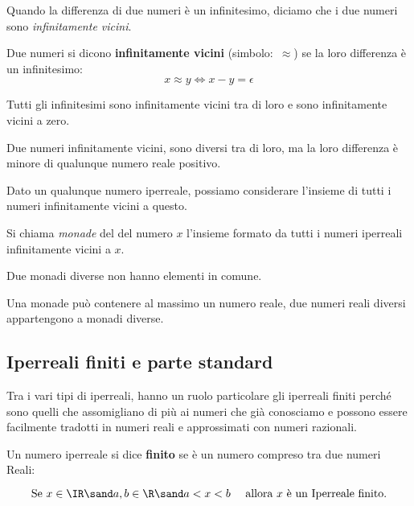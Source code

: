 Quando la differenza di due numeri è un infinitesimo, diciamo 
che i due numeri sono \emph{infinitamente vicini}.

\begin{definizione}    %
Due numeri si dicono \textbf{infinitamente vicini} (simbolo:~\(\approx\)) se 
la loro differenza è un infinitesimo:
\[x \approx y \Leftrightarrow x - y = \epsilon\]
\end{definizione}

Tutti gli infinitesimi sono infinitamente vicini tra di loro e sono 
infinitamente vicini a zero.

Due numeri infinitamente vicini, sono diversi tra di loro, ma la loro 
differenza è minore di qualunque numero reale positivo.

Dato un qualunque numero iperreale, possiamo considerare l'insieme di tutti 
i numeri infinitamente vicini a questo. 

\begin{definizione}
 Si chiama \emph{monade} del del numero \(x\) l'insieme formato da tutti i 
numeri iperreali infinitamente vicini a \(x\).
\end{definizione}

Due monadi diverse non hanno elementi in comune.

Una monade può contenere al massimo un numero reale, due numeri reali 
diversi appartengono a monadi diverse.

\subsection{Iperreali finiti e parte standard}
\label{subsec:insnum_partestandard}

Tra i vari tipi di iperreali, hanno un ruolo particolare gli iperreali 
finiti perché sono quelli che assomigliano di più ai numeri che già 
conosciamo e possono essere facilmente tradotti in numeri reali e 
approssimati con numeri razionali. 

\begin{definizione}
 Un numero iperreale si dice \textbf{finito} se è un numero compreso tra 
due numeri Reali:

\[\text{Se } x \in \IR \sand a, b \in \R \sand 
  a < x < b \quad \text{ allora } x \text{ è un Iperreale finito.}\]
\end{definizione}

